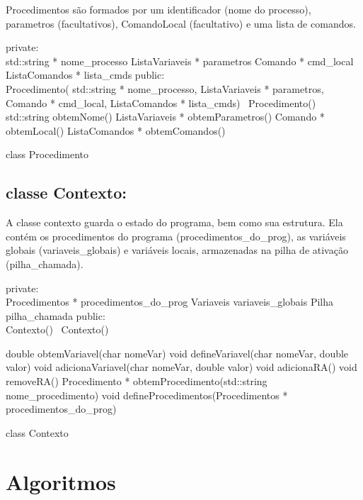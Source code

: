 \documentclass[12pt]{article}
\begin{document}
Procedimentos são formados por um identificador (nome do processo), parametros (facultativos), ComandoLocal (facultativo) e uma lista de comandos.
\begin{algorithm}[h!]
\begin{footnotesize}
  
	private:\\
		std::string * nome\_processo\;
		ListaVariaveis * parametros\;
		Comando * cmd\_local\;
		ListaComandos * lista\_cmds\;
	public:\\
		Procedimento(	std::string * nome\_processo, 
				ListaVariaveis * parametros, 
				Comando * cmd\_local, 
				ListaComandos * lista\_cmds)\;
		~Procedimento()\;
		std::string obtemNome()\;
		ListaVariaveis * obtemParametros()\;
		Comando * obtemLocal()\;
		ListaComandos * obtemComandos()\;
	
\caption{class Procedimento}%
\end{footnotesize}
\end{algorithm}

\subsection{classe Contexto:} 

A classe contexto guarda o estado do programa, bem como sua estrutura. Ela contém os procedimentos do programa (procedimentos\_do\_prog), as variáveis globais (variaveis\_globais) e variáveis locais, armazenadas na pilha de ativação (pilha\_chamada).
\begin{algorithm}[h!]
\begin{footnotesize}
  
	private:\\
		Procedimentos * procedimentos\_do\_prog\;
		Variaveis variaveis\_globais\;
		Pilha pilha\_chamada\;
	public:\\
		Contexto()\;
		~Contexto()\;
		
		double obtemVariavel(char nomeVar)\;
		void defineVariavel(char nomeVar, double valor)\;
		void adicionaVariavel(char nomeVar, double valor)\;
		void adicionaRA()\;
		void removeRA()\;
		Procedimento * obtemProcedimento(std::string nome\_procedimento)\;
		void defineProcedimentos(Procedimentos * procedimentos\_do\_prog)\;
	
\caption{class Contexto}%
\end{footnotesize}
\end{algorithm}

\section{Algoritmos}
\end{document}
